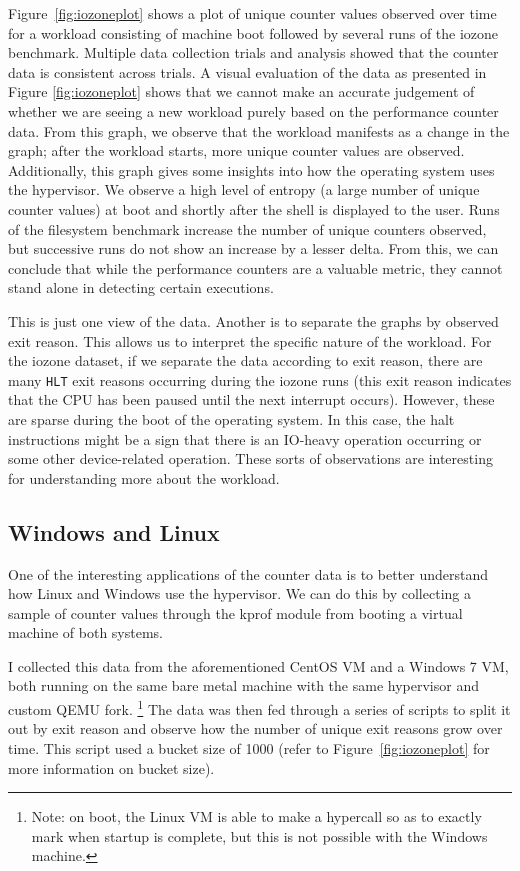 \documentclass[notitlepage]{article}
\begin{document}
Figure~\ref{fig:iozoneplot} shows a plot of unique counter values observed over
time for a workload consisting of machine boot followed by several runs of the
iozone benchmark. Multiple data collection trials and analysis showed that the
counter data is consistent across trials. A visual evaluation of the data as
presented in Figure \ref{fig:iozoneplot} shows that we cannot make an accurate
judgement of whether we are seeing a new workload purely based on the
performance counter data. From this graph, we observe that the workload
manifests as a change in the graph; after the workload starts, more unique
counter values are observed.  Additionally, this graph gives some insights into
how the operating system uses the hypervisor. We observe a high level of entropy
(a large number of unique counter values) at boot and shortly after the shell is
displayed to the user. Runs of the filesystem benchmark increase the number of
unique counters observed, but successive runs do not show an increase by a
lesser delta. From this, we can conclude that while the performance counters are
a valuable metric, they cannot stand alone in detecting certain executions.

This is just one view of the data. Another is to separate the graphs by observed
exit reason. This allows us to interpret the specific nature of the workload.
For the iozone dataset, if we separate the data according to exit reason, there
are many \texttt{HLT} exit reasons occurring during the iozone runs (this exit
reason indicates that the CPU has been paused until the next interrupt occurs).
However, these are sparse during the boot of the operating system. In this case,
the halt instructions might be a sign that there is an IO-heavy operation
occurring or some other device-related operation. These sorts of observations
are interesting for understanding more about the workload.

\subsection{Windows and Linux}
One of the interesting applications of the counter data is to better understand
how Linux and Windows use the hypervisor. We can do this by collecting a sample
of counter values through the kprof module from booting a virtual machine of
both systems.

I collected this data from the aforementioned CentOS VM and a Windows 7 VM, both
running on the same bare metal machine with the same hypervisor and custom QEMU
fork. \footnote{Note: on boot, the Linux VM is able to make a hypercall so as to
    exactly mark when startup is complete, but this is not possible with the
Windows machine.} The data was then fed through a series of scripts to split it
out by exit reason and observe how the number of unique exit reasons grow over
time. This script used a bucket size of 1000 (refer to
Figure~\ref{fig:iozoneplot} for more information on bucket size).
\end{document}
